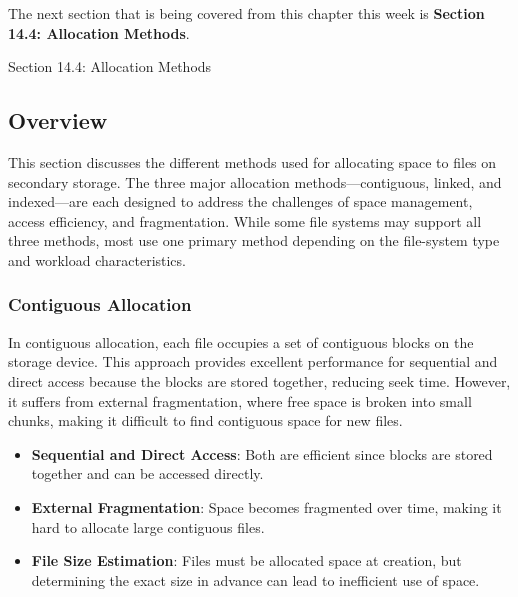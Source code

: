 The next section that is being covered from this chapter this week is \textbf{Section 14.4: Allocation Methods}.

\begin{notes}{Section 14.4: Allocation Methods}
    \subsection*{Overview}

    This section discusses the different methods used for allocating space to files on secondary storage. The three major allocation methods—contiguous, linked, and indexed—are each designed to address 
    the challenges of space management, access efficiency, and fragmentation. While some file systems may support all three methods, most use one primary method depending on the file-system type and 
    workload characteristics.
    
    \subsubsection*{Contiguous Allocation}
    
    In contiguous allocation, each file occupies a set of contiguous blocks on the storage device. This approach provides excellent performance for sequential and direct access because the blocks are stored 
    together, reducing seek time. However, it suffers from external fragmentation, where free space is broken into small chunks, making it difficult to find contiguous space for new files.
    
    \begin{highlight}
    
        \begin{itemize}
            \item \textbf{Sequential and Direct Access}: Both are efficient since blocks are stored together and can be accessed directly.
            \item \textbf{External Fragmentation}: Space becomes fragmented over time, making it hard to allocate large contiguous files.
            \item \textbf{File Size Estimation}: Files must be allocated space at creation, but determining the exact size in advance can lead to inefficient use of space.
        \end{itemize}
    
    \end{highlight}
    

\end{notes}
